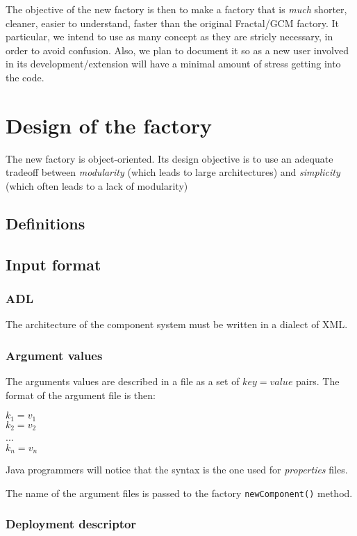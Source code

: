 \documentclass{article}
\newcommand{\code}[1]{\texttt{#1}}
\begin{document}
The objective of the new factory is then to make a factory that is {\em much} shorter, cleaner,
easier to understand, faster than the original Fractal/GCM factory. It particular, we intend to
use as many concept as they are stricly necessary, in order to avoid confusion. Also, we plan to
document it so as a new user involved in its development/extension will have a minimal amount of stress getting into the code.

\section{Design of the factory}
The new factory is object-oriented. Its design objective is to use an adequate tradeoff between {\em modularity} (which
leads to large architectures) and {\em simplicity} (which often leads to a lack of modularity)

\subsection{Definitions}


\subsection{Input format}
\subsubsection{ADL}
The architecture of the component system must be written in a dialect of XML.

\subsubsection{Argument values}
The arguments values are described in a file as a set of $key=value$ pairs. The format
of the argument file is then:

\begin{center}
$k_1 = v_1$ \\
$k_2 = v_2$ \\
...  \\
$k_n = v_n$
\end{center}

Java programmers will notice that the syntax is the one used for \textit{properties} files.

The name of the argument files is passed to the factory \code{newComponent()} method.
\subsubsection{Deployment descriptor}
\end{document}
